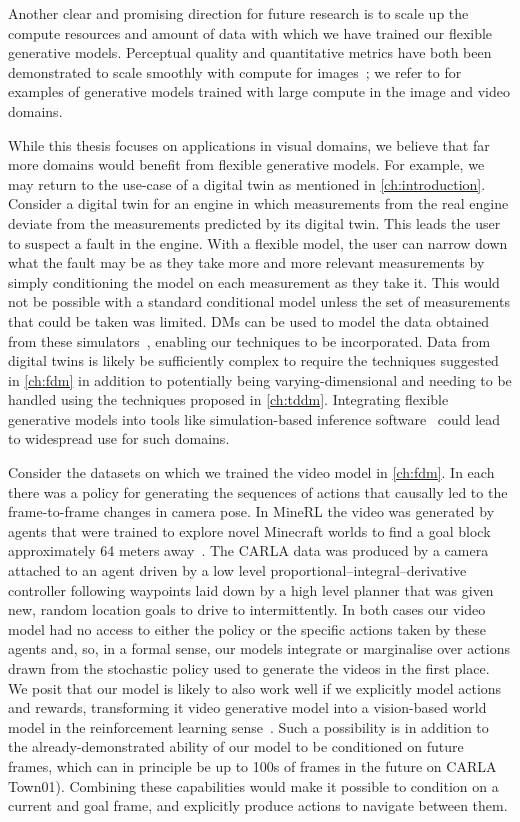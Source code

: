 Another clear and promising direction for future research is to scale up the compute resources and amount of data with which we have trained our flexible generative models. Perceptual quality and quantitative metrics have both been demonstrated to scale smoothly with compute for images~\citep{peebles2022scalable}; we refer to \citet{esser2024scaling,brooks2024video} for examples of generative models trained with large compute in the image and video domains.

While this thesis focuses on applications in visual domains, we believe that far more domains would benefit from flexible generative models. For example, we may return to the use-case of a digital twin as mentioned in \cref{ch:introduction}. Consider a digital twin for an engine in which measurements from the real engine deviate from the measurements predicted by its digital twin. This leads the user to suspect a fault in the engine. With a flexible model, the user can narrow down what the fault may be as they take more and more relevant measurements by simply conditioning the model on each measurement as they take it. This would not be possible with a standard conditional model unless the set of measurements that could be taken was limited. DMs can be used to model the data obtained from these simulators~\citep{weilbach2023graphically,gloeckler2024all}, enabling our techniques to be incorporated. Data from digital twins is likely be sufficiently complex to require the techniques suggested in \cref{ch:fdm} in addition to potentially being varying-dimensional and needing to be handled using the techniques proposed in \cref{ch:tddm}. Integrating flexible generative models into tools like simulation-based inference software~\citep{gloeckler2024all} could lead to widespread use for such domains.

Consider the datasets on which we trained the video model in \cref{ch:fdm}. In each there was a policy for generating the sequences of actions that causally led to the frame-to-frame changes in camera pose. In MineRL the video was generated by agents that were trained to explore novel Minecraft worlds to find a goal block approximately 64 meters away~\citep{saxena2021clockwork}. The CARLA data was produced by a camera attached to an agent driven by a low level proportional–integral–derivative controller following waypoints laid down by a high level planner that was given new, random location goals to
drive to intermittently. In both cases our video model had no access to either the policy or the specific actions taken by these agents and, so, in a formal sense, our models integrate or marginalise over actions drawn from the stochastic policy used to generate the videos in the first place. We posit that our model is likely to also work well if we explicitly model actions and rewards, transforming it video generative model into a vision-based world model in the reinforcement learning sense~\citep{kaiser2019model}. Such a possibility is in addition to the already-demonstrated ability of our model to be conditioned on future frames, which can in principle be up to 100s of frames in the future on CARLA Town01). Combining these capabilities would make it possible to condition on a current and goal frame, and explicitly produce actions to navigate between them.

